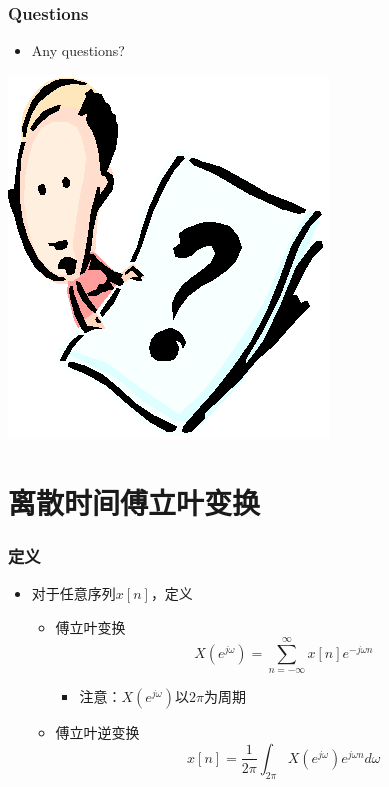 \documentclass[CJKutf8,xcolor=pdftex,dvipsnames,table]{beamer}
\begin{document}
\begin{CJK*}{UTF8}{song}
  \begin{frame}
    \frametitle{Questions}
    \begin{itemize}
    \item Any questions?
    \end{itemize}
    \begin{center}
      \includegraphics[scale=.5]{question}
    \end{center}
  \end{frame}  
  
  \section{离散时间傅立叶变换}

  \begin{frame}
    \frametitle{定义}
    \begin{itemize}
    \item 对于任意序列$x[n]$，定义
    \begin{itemize}
    	\item 傅立叶变换
    	\[
			X(e^{j\omega}) = \sum_{n=-\infty}^{\infty}x[n]e^{-j\omega n}    
    	\]
			\begin{itemize}
			\item 注意：$X(e^{j\omega})$以$2\pi$为周期
			\end{itemize}	
    	\item 傅立叶逆变换
    	\[
			x[n] = \frac{1}{2\pi}\int_{2\pi}X(e^{j\omega})e^{j\omega n}d\omega    
    	\]
    	\end{itemize}
    \end{itemize}


\end{frame}
\end{CJK*}
\end{document}

